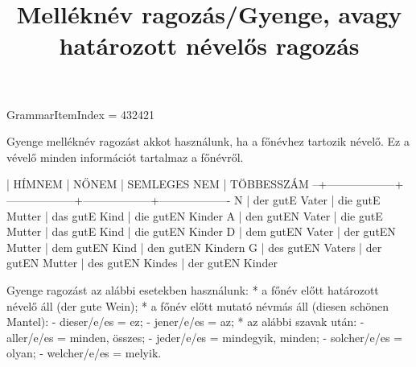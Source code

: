 \title{Melléknév ragozás/Gyenge, avagy határozott névelős ragozás}

GrammarItemIndex = 432421

\begin{desc}
Gyenge melléknév ragozást akkot használunk, ha a főnévhez tartozik névelő. Ez a vévelő minden információt tartalmaz a főnévről.

  | HÍMNEM           | NŐNEM            | SEMLEGES NEM     | TÖBBESSZÁM
--+------------------+------------------+------------------+-------------------
N | der gutE Vater   | die gutE Mutter  | das gutE Kind    | die gutEN Kinder
A | den gutEN Vater  | die gutE Mutter  | das gutE Kind    | die gutEN Kinder
D | dem gutEN Vater  | der gutEN Mutter | dem gutEN Kind   | den gutEN Kindern
G | des gutEN Vaters | der gutEN Mutter | des gutEN Kindes | der gutEN Kinder

Gyenge ragozást az alábbi esetekben használunk:
* a főnév előtt határozott névelő áll (der gute Wein);
* a főnév előtt mutató névmás áll (diesen schönen Mantel):
  - dieser/e/es = ez;
  - jener/e/es = az;
* az alábbi szavak után:
  - aller/e/es = minden, összes;
  - jeder/e/es = mindegyik, minden;
  - solcher/e/es = olyan;
  - welcher/e/es = melyik.
\end{desc}

